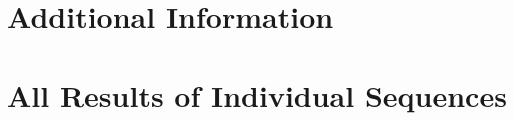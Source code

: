 \chapter{Additional Information}





\chapter{All Results of Individual Sequences}

\newpage

\newpage

\newpage

\newpage

\newpage

\newpage

\newpage

\newpage

\newpage

\newpage

\newpage

\newpage






